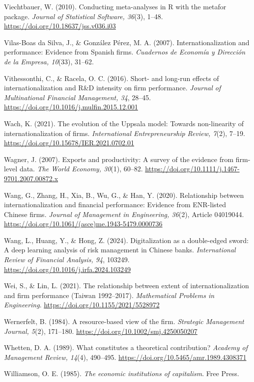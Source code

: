 \documentclass[
  a4paper,
  13pt]{extreport}
\begin{document}
Viechtbauer, W. (2010). Conducting meta-analyses in R with the metafor
package. \emph{Journal of Statistical Software, 36}(3), 1--48.
\url{https://doi.org/10.18637/jss.v036.i03}

Vilas-Boas da Silva, J., \& González Pérez, M. A. (2007).
Internationalization and performance: Evidence from Spanish firms.
\emph{Cuadernos de Economía y Dirección de la Empresa, 10}(33), 31--62.

Vithessonthi, C., \& Racela, O. C. (2016). Short- and long-run effects
of internationalization and R\&D intensity on firm performance.
\emph{Journal of Multinational Financial Management, 34}, 28--45.
\url{https://doi.org/10.1016/j.mulfin.2015.12.001}

Wach, K. (2021). The evolution of the Uppsala model: Towards
non-linearity of internationalization of firms. \emph{International
Entrepreneurship Review, 7}(2), 7--19.
\url{https://doi.org/10.15678/IER.2021.0702.01}

Wagner, J. (2007). Exports and productivity: A survey of the evidence
from firm-level data. \emph{The World Economy, 30}(1), 60--82.
\url{https://doi.org/10.1111/j.1467-9701.2007.00872.x}

Wang, G., Zhang, H., Xia, B., Wu, G., \& Han, Y. (2020). Relationship
between internationalization and financial performance: Evidence from
ENR-listed Chinese firms. \emph{Journal of Management in Engineering,
36}(2), Article 04019044.
\url{https://doi.org/10.1061/(asce)me.1943-5479.0000736}

Wang, L., Huang, Y., \& Hong, Z. (2024). Digitalization as a
double-edged sword: A deep learning analysis of risk management in
Chinese banks. \emph{International Review of Financial Analysis, 94},
103249. \url{https://doi.org/10.1016/j.irfa.2024.103249}

Wei, S., \& Lin, L. (2021). The relationship between extent of
internationalization and firm performance (Taiwan 1992--2017).
\emph{Mathematical Problems in Engineering}.
\url{https://doi.org/10.1155/2021/5528972}

Wernerfelt, B. (1984). A resource-based view of the firm.
\emph{Strategic Management Journal, 5}(2), 171--180.
\url{https://doi.org/10.1002/smj.4250050207}

Whetten, D. A. (1989). What constitutes a theoretical contribution?
\emph{Academy of Management Review, 14}(4), 490--495.
\url{https://doi.org/10.5465/amr.1989.4308371}

Williamson, O. E. (1985). \emph{The economic institutions of
capitalism}. Free Press.
\end{document}
